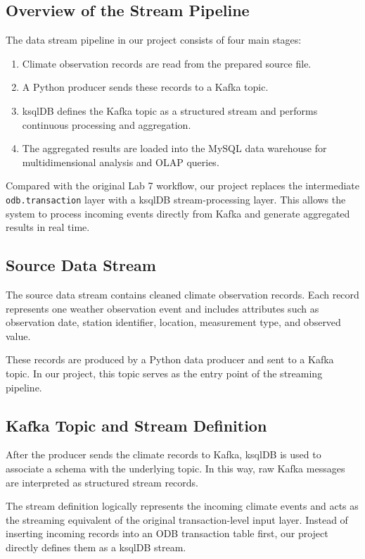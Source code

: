 \documentclass[11pt]{article}
\begin{document}
\subsection{Overview of the Stream Pipeline}

The data stream pipeline in our project consists of four main stages:

\begin{enumerate}
    \item Climate observation records are read from the prepared source file.
    \item A Python producer sends these records to a Kafka topic.
    \item ksqlDB defines the Kafka topic as a structured stream and performs continuous processing and aggregation.
    \item The aggregated results are loaded into the MySQL data warehouse for multidimensional analysis and OLAP queries.
\end{enumerate}

Compared with the original Lab 7 workflow, our project replaces the intermediate \texttt{odb.transaction} layer with a ksqlDB stream-processing layer. This allows the system to process incoming events directly from Kafka and generate aggregated results in real time.

\subsection{Source Data Stream}

The source data stream contains cleaned climate observation records. Each record represents one weather observation event and includes attributes such as observation date, station identifier, location, measurement type, and observed value.

These records are produced by a Python data producer and sent to a Kafka topic. In our project, this topic serves as the entry point of the streaming pipeline.

\subsection{Kafka Topic and Stream Definition}

After the producer sends the climate records to Kafka, ksqlDB is used to associate a schema with the underlying topic. In this way, raw Kafka messages are interpreted as structured stream records.

The stream definition logically represents the incoming climate events and acts as the streaming equivalent of the original transaction-level input layer. Instead of inserting incoming records into an ODB transaction table first, our project directly defines them as a ksqlDB stream.
\end{document}
